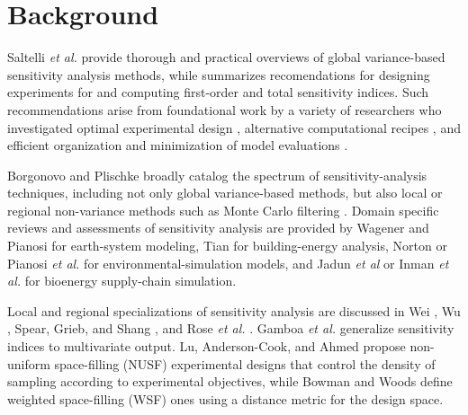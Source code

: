 \documentclass[12pt]{article}
\begin{document}
\section{Background}

Saltelli \textit{et al.} \cite{saltelli_sensitivity_2004} \cite{saltelli_global_2008} provide thorough and practical overviews of global variance-based sensitivity analysis methods, while \cite{saltelli_variance_2010} summarizes recomendations for designing experiments for and computing first-order and total sensitivity indices. Such recommendations arise from foundational work by a variety of researchers who investigated optimal experimental design \cite{jansen_analysis_1999} \cite{saltelli_variance_2010}, alternative computational recipes \cite{saltelli_variance_2010}, and efficient organization and minimization of model evaluations \cite{saltelli_making_2002} \cite{piano_new_2019} \cite{kucherenko_estimation_2012}.

Borgonovo and Plischke \cite{borgonovo_sensitivity_2016} broadly catalog the spectrum of sensitivity-analysis techniques, including not only global variance-based methods, but also local or regional non-variance methods such as Monte Carlo filtering \cite{wu_application_2017}. Domain specific reviews and assessments of sensitivity analysis are provided by Wagener and Pianosi \cite{wagener_what_2019} for earth-system modeling, Tian \cite{tian_review_2013} for building-energy analysis, Norton \cite{norton_introduction_2015} or Pianosi \textit{et al.} \cite{pianosi_sensitivity_2016} for environmental-simulation models, and Jadun \textit{et al} \cite{jadun_application_2017} or Inman \textit{et al.} \cite{inman_application_2018} for bioenergy supply-chain simulation.

Local and regional specializations of sensitivity analysis are discussed in Wei \cite{wei_regional_2014}, Wu \cite{wu_application_2017}, Spear, Grieb, and Shang \cite{spear_parameter_1994}, and Rose \textit{et al.} \cite{rose_parameter_1991}. Gamboa \textit{et al.} \cite{gamboa_sensitivity_2013} generalize sensitivity indices to multivariate output. Lu, Anderson-Cook, and Ahmed \cite{lu_non-uniform_2020} propose non-uniform space-filling (NUSF) experimental designs that control the density of sampling according to experimental objectives, while Bowman and Woods \cite{bowman_weighted_2013} define weighted space-filling (WSF) ones using a distance metric for the design space.

\end{document}
